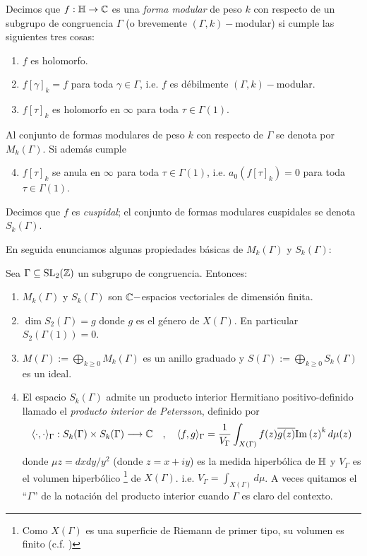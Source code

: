\begin{defin}
  Decimos que $f:\mathbb{H}\rightarrow\mathbb{C}$ es una \emph{forma modular} de peso $k$ con respecto de un subgrupo de
  congruencia $\Gamma$ (o brevemente $(\Gamma,k)-$modular) si cumple las siguientes tres cosas:
  \begin{enumerate}[label=\emph{\roman*})]
  \item $f$ es holomorfo.
  \item $f[\gamma]_k=f$ para toda $\gamma\in\Gamma$, i.e. $f$ es d\'ebilmente $(\Gamma,k)-$modular.
  \item $f[\tau]_k$ es holomorfo en $\infty$ para toda $\tau\in\Gamma(1)$.
  \end{enumerate}
  Al conjunto de formas modulares de peso $k$ con respecto de $\Gamma$ se denota por $M_k(\Gamma)$.
  Si adem\'as cumple
  \begin{enumerate}[label=\emph{\roman*})]\setcounter{enumi}{3}
  \item $f[\tau]_k$ se anula en $\infty$ para toda $\tau\in\Gamma(1)$, i.e. $a_0(f[\tau]_k)=0$ para
    toda $\tau\in\Gamma(1)$.
  \end{enumerate}
  Decimos que $f$ es \emph{cuspidal}; el conjunto de formas modulares cuspidales se
  denota $S_k(\Gamma)$.
\end{defin}

En seguida enunciamos algunas propiedades b\'asicas de $M_k(\Gamma)$ y $S_k(\Gamma)$:

\begin{prop}\label{prop:prop_de_M}
 Sea $\Gamma\subseteq\mathrm{SL}_2(\mathbb{Z})$ un subgrupo de congruencia. Entonces:
  \begin{enumerate}[label=\roman*)]
  \item $M_k(\Gamma)$ y $S_k(\Gamma)$ son $\mathbb{C}-$espacios vectoriales de dimensi\'on finita.
  \item $\dim S_2(\Gamma)=g$ donde $g$ es el g\'enero de $X(\Gamma)$. En particular $S_2(\Gamma(1))=0$.
  \item\label{prop_de_M_3} $M(\Gamma):=\bigoplus_{k\geq0}M_k(\Gamma)$ es un anillo graduado y
    $S(\Gamma):=\bigoplus_{k\geq0}S_k(\Gamma)$ es un ideal.
  \item El espacio $S_k(\Gamma)$ admite un producto interior Hermitiano positivo-definido
    llamado el \emph{producto interior de Petersson}, definido por
    \[
      \langle \cdot,\cdot \rangle_{\Gamma}:S_k(\Gamma)\times S_k(\Gamma)\longrightarrow\mathbb{C}\quad,\quad
      \langle f,g \rangle_{\Gamma}=\frac{1}{V_{\Gamma}}\int_{X(\Gamma)}f(z)\overline{g(z)}\mathrm{Im}\left( z \right)^kd\mu(z)
    \]
    donde $\mu z=dxdy/y^2$ (donde $z=x+iy$) es la medida hiperb\'olica de $\mathbb{H}$ y $V_{\Gamma}$ es
    el volumen hiperb\'olico%
    \footnote{Como $X(\Gamma)$ es una superficie de Riemann de primer tipo, su
      volumen es finito (c.f. \cite{FarkasKra})} de $X(\Gamma)$. i.e.
    $V_{\Gamma}=\int_{X(\Gamma)}d\mu$. A veces quitamos el ``$\Gamma$'' de la notaci\'on del producto
    interior cuando $\Gamma$ es claro del contexto.
  \end{enumerate}
\end{prop}

